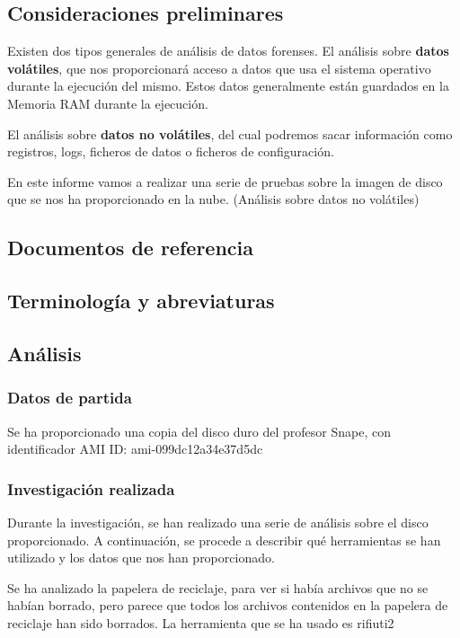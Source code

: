 \subsection{Consideraciones preliminares}

Existen dos tipos generales de análisis de datos forenses.
El análisis sobre \textbf{datos volátiles}, que nos proporcionará acceso a datos que usa el sistema operativo durante la ejecución del mismo.
Estos datos generalmente están guardados en la Memoria RAM durante la ejecución. 

El análisis sobre \textbf{datos no volátiles}, del cual podremos sacar información como registros, logs, ficheros de datos o ficheros de configuración.

En este informe vamos a realizar una serie de pruebas sobre la imagen de disco que se nos ha proporcionado en la nube. (Análisis sobre datos no volátiles) 

\subsection{Documentos de referencia}
\printbibliography
\subsection{Terminología y abreviaturas}
\printglossaries
\subsection{Análisis}
\subsubsection{Datos de partida}

Se ha proporcionado una copia del disco duro del profesor Snape, con identificador AMI ID: ami-099dc12a34e37d5dc 

\subsubsection{Investigación realizada}

Durante la investigación, se han realizado una serie de análisis sobre el disco proporcionado.
A continuación, se procede a describir qué herramientas se han utilizado y los datos que nos han proporcionado.

Se ha analizado la papelera de reciclaje, para ver si había archivos que no se habían borrado, pero parece que todos los archivos contenidos en la papelera de reciclaje han sido borrados. La herramienta que se ha usado es rifiuti2 \cite{rifiuti2}

